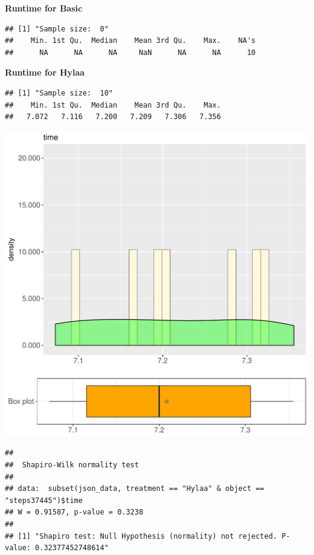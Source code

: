 \documentclass{article}\usepackage[]{graphicx}\usepackage[]{color}
\makeatletter
\def\maxwidth{ %
  \ifdim\Gin@nat@width>\linewidth
    \linewidth
  \else
    \Gin@nat@width
  \fi
}
\newenvironment{kframe}{%
 \def\at@end@of@kframe{}%
 \ifinner\ifhmode%
  \def\at@end@of@kframe{\end{minipage}}%
  \begin{minipage}{\columnwidth}%
 \fi\fi%
 \def\FrameCommand##1{\hskip\@totalleftmargin \hskip-\fboxsep
 \colorbox{shadecolor}{##1}\hskip-\fboxsep
     \hskip-\linewidth \hskip-\@totalleftmargin \hskip\columnwidth}%
 \MakeFramed {\advance\hsize-\width
   \@totalleftmargin\z@ \linewidth\hsize
   \@setminipage}}%
 {\par\unskip\endMakeFramed%
 \at@end@of@kframe}
\newenvironment{knitrout}{}{} %
\makeatother
\begin{document}
 \textbf{Runtime for Basic}
\begin{knitrout}
\color{fgcolor}\begin{kframe}
\begin{verbatim}
## [1] "Sample size:  0"
##    Min. 1st Qu.  Median    Mean 3rd Qu.    Max.    NA's 
##      NA      NA      NA     NaN      NA      NA      10
\end{verbatim}
\end{kframe}
\end{knitrout}
 \textbf{Runtime for Hylaa}
\begin{knitrout}
\color{fgcolor}\begin{kframe}
\begin{verbatim}
## [1] "Sample size:  10"
##    Min. 1st Qu.  Median    Mean 3rd Qu.    Max. 
##   7.072   7.116   7.200   7.209   7.306   7.356
\end{verbatim}
\end{kframe}
\includegraphics[width=\maxwidth]{figure/RH3_Hylaa_steps37445-1} 
\begin{kframe}\begin{verbatim}
## 
## 	Shapiro-Wilk normality test
## 
## data:  subset(json_data, treatment == "Hylaa" & object == "steps37445")$time
## W = 0.91587, p-value = 0.3238
## 
## [1] "Shapiro test: Null Hypothesis (normality) not rejected. P-value: 0.32377452748614"
\end{verbatim}
\end{kframe}
\end{knitrout}
  
\end{document}

